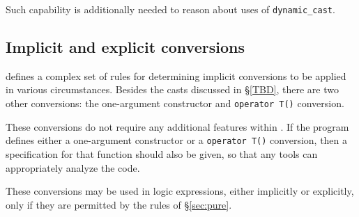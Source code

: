Such capability is additionally needed to reason about uses of \lstinline|dynamic_cast|.

\subsection{Implicit and explicit conversions}

\lang{} defines a complex set of rules for determining implicit conversions to be applied in various circumstances. Besides the casts discussed in \S\ref{TBD}, there are two other conversions: the one-argument constructor and \lstinline|operator T()| conversion. 

These conversions do not require any additional features within 
\NAME{}. If the program defines either a one-argument constructor or a
\lstinline|operator T()| conversion, then a specification for that
function should also be given, so that any \NAME{} tools can appropriately analyze the code.

These conversions may be used in logic expressions, either implicitly or explicitly, only if they are permitted by the rules of \S\ref{sec:pure}. 

